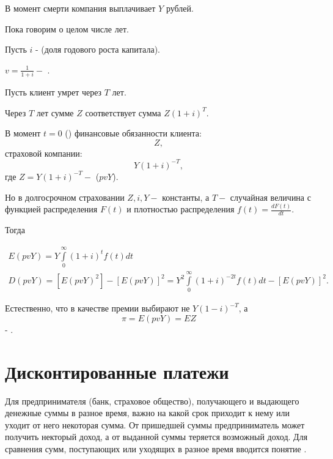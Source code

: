В момент смерти компания выплачивает $ Y$ рублей.

Пока говорим о целом числе лет.

\begin{mindanddef}
	Пусть $ i$ -  (доля годового роста капитала).

	$ v = \frac{1}{1+i} -  $ .

	Пусть клиент умрет через $ T$ лет.

	Через $ T$ лет сумме $ Z$ соответствует сумма $ Z(1+i)^T.$

	В момент $ t = 0$ () финансовые обязанности клиента: \[ Z, \]
	страховой компании: \[ Y(1+i)^{-T}, \]
	где $ Z = Y(1+i)^{-T} - $  ($pvY$).

	Но в долгосрочном страховании $ Z, i , Y - $ константы, а $ T -$ случайная величина с функцией распределения $ F(t)$ и плотностью распределения $ f(t) = \frac{dF(t)}{dt} $.

	Тогда 

	\begin{gather*}
		E(pvY) = Y \int\limits^{\infty}_{0}(1+i)^tf(t)dt\\
		D(pvY) = [E(pvY)^2] - [E(pvY)]^2 = Y^2 \int\limits^{\infty}_{0}(1+i)^{-2t}f(t)dt - [E(pvY)]^2.
	\end{gather*}

	Естественно, что в качестве премии выбирают не $ Y(1-i)^{-T}$, а 
	\[ \pi = E(pvY)= EZ \]
	- .

\end{mindanddef}

\section{Дисконтированные платежи} %
Для предпринимателя (банк, страховое общество), получающего и выдающего денежные суммы в разное время, важно на какой срок приходит к нему или уходит от него некоторая сумма. От пришедшей суммы предприниматель может получить некторый доход, а от выданной суммы теряется возможный доход. Для сравнения сумм, поступающих или уходящих в разное время вводится понятие .

